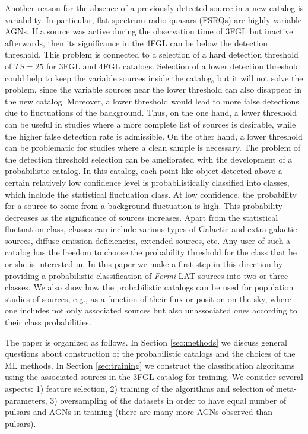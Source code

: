 \documentclass{aa}
\newcommand{\Fermi}{\textit{Fermi}\xspace}
\begin{document}
Another reason for the absence of a previously detected source in a new catalog is variability.
In particular, flat spectrum radio quasars (FSRQs) are highly variable AGNs.
If a source was active during the observation time of 3FGL but inactive afterwards, 
then its significance in the 4FGL can be below the detection threshold.
This problem is connected to a selection of a hard detection threshold of $TS = 25$ for 3FGL and 4FGL catalogs.
Selection of a lower detection threshold could help to keep the variable sources inside the catalog, 
but it will not solve the problem, since the variable sources near the lower threshold can also disappear in the new catalog.
Moreover, a lower threshold would lead to more false detections due to fluctuations of the background.
Thus, on the one hand, a lower threshold can be useful in studies where a more complete list of sources is desirable,
while the higher false detection rate is admissible. On the other hand, a lower threshold can be problematic for studies where 
a clean sample is necessary. 
The problem of the detection threshold selection can be ameliorated with the development of a probabilistic catalog.
In this catalog, each point-like object detected above a certain relatively low confidence level
is probabilistically classified into classes, which include the statistical fluctuation class.
At low confidence, the probability for a source to come from a background fluctuation is high.
This probability decreases as the significance of sources increases.
Apart from the statistical fluctuation class, classes can include various types of Galactic and extra-galactic sources, diffuse emission deficiencies, extended sources, etc.
Any user of such a catalog has the freedom to choose the probability threshold for the class that he or she is interested in.
In this paper we make a first step in this direction by providing a probabilistic classification of \Fermi-LAT sources into two or three classes.
We also show how the probabilistic catalogs can be used for population studies of sources, e.g., as a function of their flux or position on the sky, where one includes not only associated sources but also unassociated ones according to their class probabilities.

The paper is organized as follows.
In Section \ref{sec:methods} we discuss general questions about construction of the probabilistic catalogs and the choices of the ML methods.
In Section \ref{sec:training} we construct the classification algorithms using the associated sources in the 3FGL catalog for training. We consider several aspects: 1) feature selection, 2) training of the algorithms and selection of meta-parameters,
3) oversampling of the datasets in order to have equal number of pulsars and AGNs in training (there are many more AGNs observed than pulsars).
\end{document}
